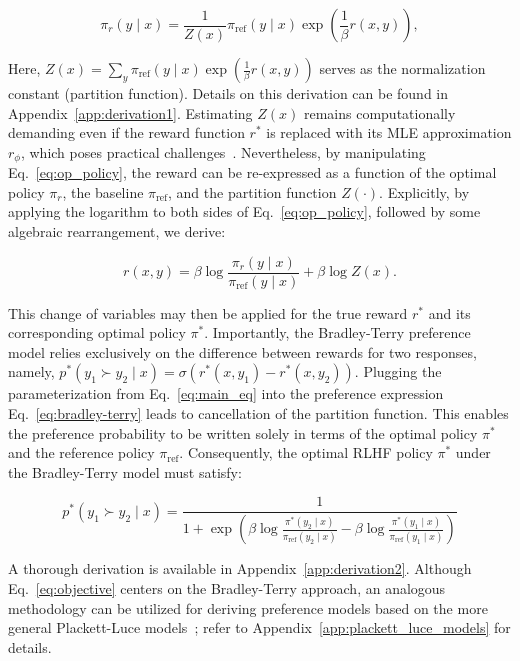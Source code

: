 \begin{equation}\label{eq:op_policy}
    \pi_r(y\mid x) = \frac{1}{Z(x)}\pi_\text{ref}(y\mid x)\exp\left(\frac{1}{\beta}r(x, y)\right),
\end{equation}

Here, $Z(x) =\sum_{y}\pi_\text{ref}(y\mid x)\exp\left(\frac{1}{\beta}r(x, y)\right)$ serves as the normalization constant (partition function). Details on this derivation can be found in Appendix~\ref{app:derivation1}. Estimating $Z(x)$ remains computationally demanding even if the reward function $r^*$ is replaced with its MLE approximation $r_{\phi}$, which poses practical challenges~\citep{korbak2022reinforcement, go2023aligning}. Nevertheless, by manipulating Eq.~\ref{eq:op_policy}, the reward can be re-expressed as a function of the optimal policy $\pi_r$, the baseline $\pi_\text{ref}$, and the partition function $Z(\cdot)$. Explicitly, by applying the logarithm to both sides of Eq.~\ref{eq:op_policy}, followed by some algebraic rearrangement, we derive:

\begin{equation}\label{eq:main_eq}
    r(x,y) =\beta \log \frac{\pi_r(y\mid x)}{\pi_\text{ref}(y\mid x)} + \beta \log Z(x).
\end{equation}

This change of variables may then be applied for the true reward $r^*$ and its corresponding optimal policy $\pi^*$. Importantly, the Bradley-Terry preference model relies exclusively on the difference between rewards for two responses, namely, ${p^*(y_1 \succ y_2 \mid x) = \sigma(r^*(x, y_1) - r^*(x, y_2))}$. Plugging the parameterization from Eq.~\ref{eq:main_eq} into the preference expression Eq.~\ref{eq:bradley-terry} leads to cancellation of the partition function. This enables the preference probability to be written solely in terms of the optimal policy $\pi^*$ and the reference policy $\pi_\text{ref}$. Consequently, the optimal RLHF policy $\pi^*$ under the Bradley-Terry model must satisfy:

\begin{equation}\label{eq:objective}
    p^*(y_1\succ y_2 \mid x)=\frac{1}{1 + \exp\left(\beta \log \frac{\pi^*(y_2\mid x)}{\pi_\text{ref}(y_2\mid x)} - \beta \log \frac{\pi^*(y_1\mid x)}{\pi_\text{ref}(y_1\mid x)}\right)}
\end{equation}

A thorough derivation is available in Appendix~\ref{app:derivation2}. Although Eq.~\ref{eq:objective} centers on the Bradley-Terry approach, an analogous methodology can be utilized for deriving preference models based on the more general Plackett-Luce models~\citep{plackett1975analysis, luce2012individual}; refer to Appendix~\ref{app:plackett_luce_models} for details.

